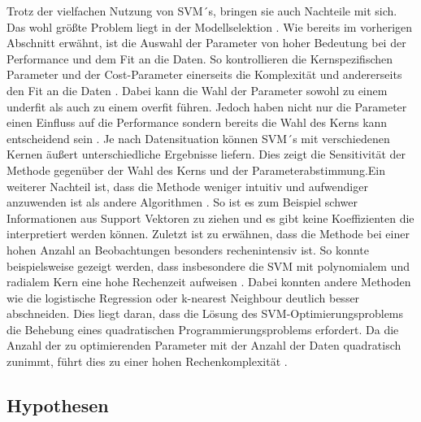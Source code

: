 \documentclass[
]{article}
\begin{document}
Trotz der vielfachen Nutzung von SVM´s, bringen sie auch Nachteile mit
sich. Das wohl größte Problem liegt in der Modellselektion
\parencite{bennettSupportVectorMachines2000}. Wie bereits im vorherigen
Abschnitt erwähnt, ist die Auswahl der Parameter von hoher Bedeutung bei
der Performance und dem Fit an die Daten. So kontrollieren die
Kernspezifischen Parameter und der Cost-Parameter einerseits die
Komplexität und andererseits den Fit an die Daten
\parencite{kuhnAppliedPredictiveModeling2013}. Dabei kann die Wahl der
Parameter sowohl zu einem underfit als auch zu einem overfit führen.
Jedoch haben nicht nur die Parameter einen Einfluss auf die Performance
sondern bereits die Wahl des Kerns kann entscheidend sein
\parencite{burgesTutorialSupportVector1998}. Je nach Datensituation
können SVM´s mit verschiedenen Kernen äußert unterschiedliche Ergebnisse
liefern. Dies zeigt die Sensitivität der Methode gegenüber der Wahl des
Kerns und der Parameterabstimmung.\newline Ein weiterer Nachteil ist,
dass die Methode weniger intuitiv und aufwendiger anzuwenden ist als
andere Algorithmen \parencite{bennettSupportVectorMachines2000}. So ist
es zum Beispiel schwer Informationen aus Support Vektoren zu ziehen und
es gibt keine Koeffizienten die interpretiert werden können.\newline
Zuletzt ist zu erwähnen, dass die Methode bei einer hohen Anzahl an
Beobachtungen besonders rechenintensiv ist. So konnte beispielsweise
gezeigt werden, dass insbesondere die SVM mit polynomialem und radialem
Kern eine hohe Rechenzeit aufweisen
\parencite{scholzComparisonClassificationMethods2021}. Dabei konnten
andere Methoden wie die logistische Regression oder k-nearest Neighbour
deutlich besser abschneiden. Dies liegt daran, dass die Lösung des
SVM-Optimierungsproblems die Behebung eines quadratischen
Programmierungsproblems erfordert. Da die Anzahl der zu optimierenden
Parameter mit der Anzahl der Daten quadratisch zunimmt, führt dies zu
einer hohen Rechenkomplexität
\parencite{kecmanSupportVectorMachines2005}.

\subsection{Hypothesen}
\end{document}
